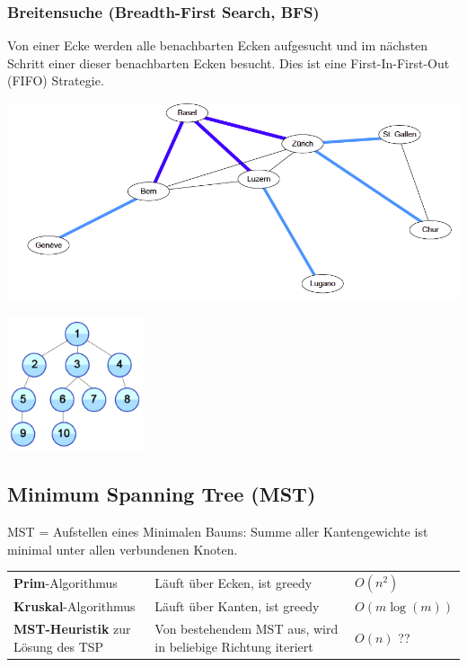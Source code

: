 \begin{minipage}{0.5\textwidth}
	\subsubsection{Breitensuche (Breadth-First Search, BFS)}
	  	Von einer Ecke werden alle benachbarten Ecken aufgesucht und im nächsten Schritt einer dieser benachbarten Ecken besucht. Dies ist eine First-In-First-Out (FIFO) Strategie.
	  	
	  	\includegraphics[width=\textwidth]{Content/Graphen/BFS.png}  
	  	\begin{center}\includegraphics[width=0.3\textwidth]{Content/Graphen/breitensuche.png}\end{center}
\end{minipage}

	

	
	
  	


\subsection{Minimum Spanning Tree (MST)}

MST = Aufstellen eines Minimalen Baums: Summe aller Kantengewichte ist minimal unter allen verbundenen Knoten.
	
	\begin{tabularx}{\textwidth}{p{4cm} X p{4cm}}
	  \textbf{Prim}-Algorithmus
	    & Läuft über Ecken, ist greedy
	    & $O(n^2)$ \\
	  \textbf{Kruskal}-Algorithmus
	    & Läuft über Kanten, ist greedy
	    & $O(m \log(m))$\\
	  \textbf{MST-Heuristik} zur Lö\-sung des TSP
	    & Von bestehendem MST aus, wird in beliebige Richtung iteriert
	    & $O(n)$ ??
	\end{tabularx}



